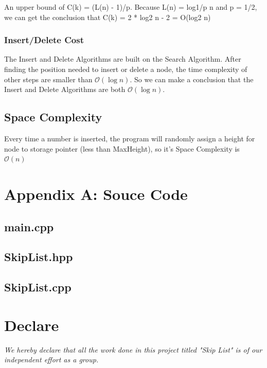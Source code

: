\documentclass[10pt,english, openany]{book}
\begin{document}
An upper bound of C(k) = (L(n) - 1)/p. Because L(n) = log1/p n and p = 1/2, we can get the conclusion that C(k) = 2 * log2 n - 2 = O(log2 n)
\subsection{Insert/Delete Cost}
The Insert and Delete Algorithms are built on the Search Algorithm. After finding the position needed to insert or delete a node, the time complexity of other steps are smaller than $\mathcal O(\log n)$. So we can make a conclusion that the Insert and Delete Algorithms are both $\mathcal O(\log n)$.
\section{Space Complexity}
Every time a number is inserted, the program will randomly assign a height for node to storage pointer (less than MaxHeight), so it’s Space Complexity is $\mathcal O(n)$

\pagebreak





\pagebreak

\chapter*{Appendix A: Souce Code}
\section*{main.cpp}
\section*{SkipList.hpp}
\section*{SkipList.cpp}
\pagebreak

\chapter*{Declare}
\textit{We hereby declare that all the work done in this project titled "Skip List" is of our independent effort as a group.}
\end{document}
